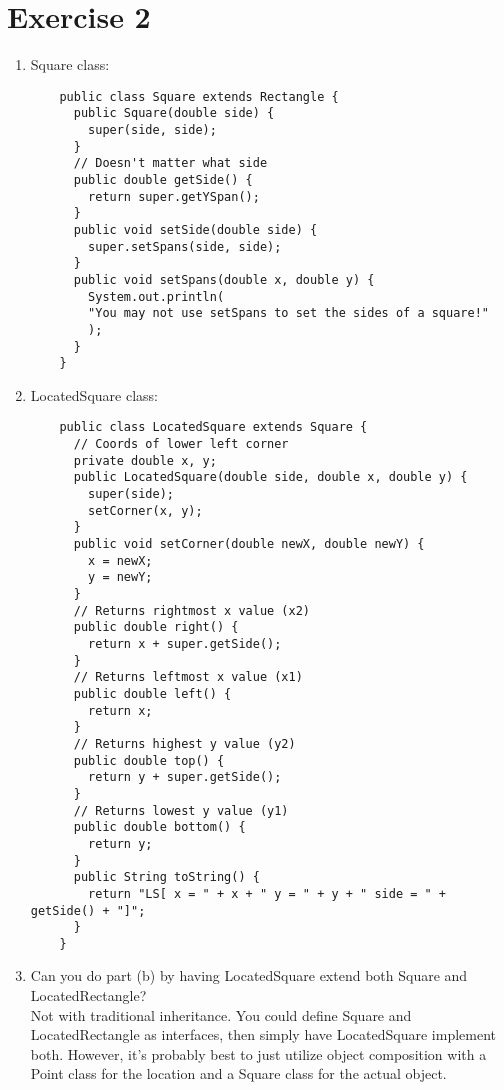 \documentclass[12pt]{article}
\begin{document}
\section{Exercise 2}
\begin{enumerate}[label=(\alph*)]
\item Square class:
  \begin{verbatim}
    public class Square extends Rectangle {
      public Square(double side) {
        super(side, side);
      }
      // Doesn't matter what side
      public double getSide() {
        return super.getYSpan();
      }
      public void setSide(double side) {
        super.setSpans(side, side);
      }
      public void setSpans(double x, double y) {
        System.out.println(
        "You may not use setSpans to set the sides of a square!"
        );
      }
    }
  \end{verbatim}
\item LocatedSquare class:
  \begin{verbatim}
    public class LocatedSquare extends Square {
      // Coords of lower left corner
      private double x, y;
      public LocatedSquare(double side, double x, double y) {
        super(side);
        setCorner(x, y);
      }
      public void setCorner(double newX, double newY) {
        x = newX;
        y = newY;
      }
      // Returns rightmost x value (x2)
      public double right() {
        return x + super.getSide();
      }
      // Returns leftmost x value (x1)
      public double left() {
        return x;
      }
      // Returns highest y value (y2)
      public double top() {
        return y + super.getSide();
      }
      // Returns lowest y value (y1)
      public double bottom() {
        return y;
      }
      public String toString() {
        return "LS[ x = " + x + " y = " + y + " side = " + getSide() + "]";
      }
    }
  \end{verbatim}
\item Can you do part (b) by having LocatedSquare extend both
  Square and LocatedRectangle? \\
  Not with traditional inheritance. You could define Square and LocatedRectangle
  as interfaces, then simply have LocatedSquare implement both. However, it's
  probably best to just utilize object composition with a Point class for the
  location and a Square class for the actual object.
\end{enumerate}
\end{document}
